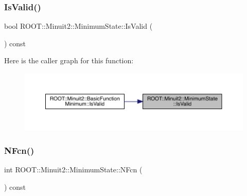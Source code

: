 \mbox{\label{classROOT_1_1Minuit2_1_1MinimumState_ae8bab1ba76b2d6597c79224e966da5f5}} 
\subsubsection{\texorpdfstring{IsValid()}{IsValid()}\hspace{0.1cm}{\footnotesize\ttfamily [2/2]}}
{\footnotesize\ttfamily bool R\+O\+O\+T\+::\+Minuit2\+::\+Minimum\+State\+::\+Is\+Valid (\begin{DoxyParamCaption}{ }\end{DoxyParamCaption}) const\hspace{0.3cm}{\ttfamily [inline]}}

Here is the caller graph for this function\+:\nopagebreak
\begin{figure}[H]
\begin{center}
\leavevmode
\includegraphics[width=350pt]{db/dcd/classROOT_1_1Minuit2_1_1MinimumState_ae8bab1ba76b2d6597c79224e966da5f5_icgraph}
\end{center}
\end{figure}
\mbox{\label{classROOT_1_1Minuit2_1_1MinimumState_aedc2a07bcaf49ef63ac092a867463731}} 
\subsubsection{\texorpdfstring{NFcn()}{NFcn()}\hspace{0.1cm}{\footnotesize\ttfamily [1/2]}}
{\footnotesize\ttfamily int R\+O\+O\+T\+::\+Minuit2\+::\+Minimum\+State\+::\+N\+Fcn (\begin{DoxyParamCaption}{ }\end{DoxyParamCaption}) const\hspace{0.3cm}{\ttfamily [inline]}}


